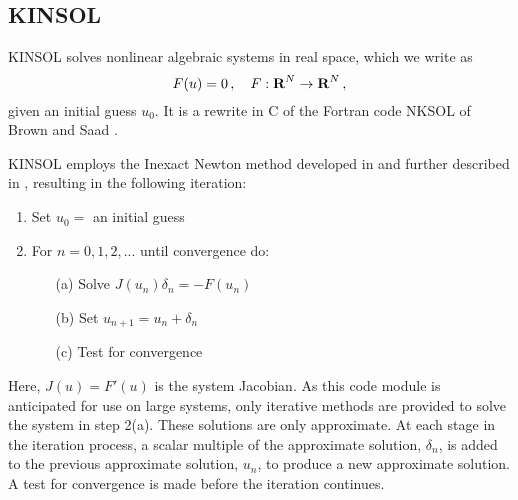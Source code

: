 \subsection{KINSOL}\label{ss:kinsol}

KINSOL solves nonlinear algebraic systems in real space, which we write as
\begin{equation}\label{nonlinear_system}
  F(u) = 0 \, , \quad F:\mbox{\bf R}^N \rightarrow \mbox{\bf R}^N \, , 
\end{equation}
given an initial guess $u_0$.  It is a rewrite in C of the Fortran
code NKSOL of Brown and Saad \cite{BrSa:90}.

KINSOL employs the Inexact Newton method developed in 
\cite{BrSa:90,Bro:87,DES:82} 
and further described in \cite{DeSc:96,Kel:95}, 
resulting in the following iteration:

\vspace{1ex}
\begin{enumerate}
   \item Set $u_0 = $ an initial guess
   \item For $n = 0, 1, 2,...$ until convergence do:
      \begin{itemize}
          \item[(a)] Solve $J(u_n)\delta_n = - F(u_n)$ 
          \item[(b)] Set $u_{n+1} = u_n + \delta_n$
          \item[(c)] Test for convergence
      \end{itemize}
\end{enumerate}
Here, $J(u) = F'(u)$ is the system Jacobian. As this code module is
anticipated for use on large systems, only iterative methods are
provided to solve the system in step 2(a). These solutions are only
approximate.  At each stage in the iteration process, a scalar
multiple of the approximate solution, $\delta_n$, is added to the
previous approximate solution, $u_n$, to produce a new approximate
solution. A test for convergence is made before the iteration
continues.

